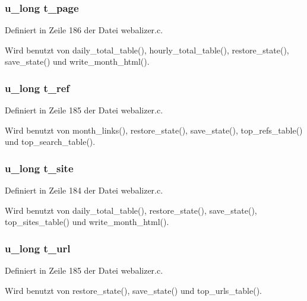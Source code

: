 \subsubsection{\setlength{\rightskip}{0pt plus 5cm}u\_\-long {\bf t\_\-page}}\label{webalizer_8h_dab177cb0d83726239072547f166262a}




Definiert in Zeile 186 der Datei webalizer.c.

Wird benutzt von daily\_\-total\_\-table(), hourly\_\-total\_\-table(), restore\_\-state(), save\_\-state() und write\_\-month\_\-html().
\subsubsection{\setlength{\rightskip}{0pt plus 5cm}u\_\-long {\bf t\_\-ref}}\label{webalizer_8h_54f4adcbb2769b5082a138f23c9bb07e}




Definiert in Zeile 185 der Datei webalizer.c.

Wird benutzt von month\_\-links(), restore\_\-state(), save\_\-state(), top\_\-refs\_\-table() und top\_\-search\_\-table().
\subsubsection{\setlength{\rightskip}{0pt plus 5cm}u\_\-long {\bf t\_\-site}}\label{webalizer_8h_e37f859c6ceb40434ecd96c6ba5d0565}




Definiert in Zeile 184 der Datei webalizer.c.

Wird benutzt von daily\_\-total\_\-table(), restore\_\-state(), save\_\-state(), top\_\-sites\_\-table() und write\_\-month\_\-html().
\subsubsection{\setlength{\rightskip}{0pt plus 5cm}u\_\-long {\bf t\_\-url}}\label{webalizer_8h_593eb26715b7f629074c61861d8dd8b3}




Definiert in Zeile 185 der Datei webalizer.c.

Wird benutzt von restore\_\-state(), save\_\-state() und top\_\-urls\_\-table().
